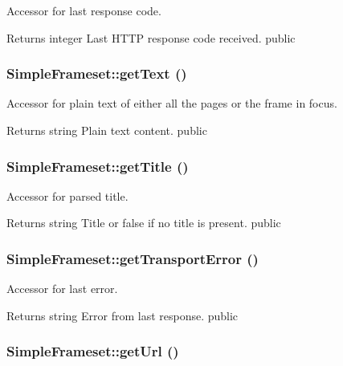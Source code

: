 \label{class_simple_frameset_a49557a01b0b0ce760bb5a4497c2e1055}
Accessor for last response code. \begin{DoxyReturn}{Returns}
integer Last HTTP response code received.  public 
\end{DoxyReturn}
\hypertarget{class_simple_frameset_ad0e21fbf4af0fd8b3fe39f565740f69b}{
\subsubsection[{getText}]{\setlength{\rightskip}{0pt plus 5cm}SimpleFrameset::getText ()}}
\label{class_simple_frameset_ad0e21fbf4af0fd8b3fe39f565740f69b}
Accessor for plain text of either all the pages or the frame in focus. \begin{DoxyReturn}{Returns}
string Plain text content.  public 
\end{DoxyReturn}
\hypertarget{class_simple_frameset_ac2de6b564406233317763be69cb2b370}{
\subsubsection[{getTitle}]{\setlength{\rightskip}{0pt plus 5cm}SimpleFrameset::getTitle ()}}
\label{class_simple_frameset_ac2de6b564406233317763be69cb2b370}
Accessor for parsed title. \begin{DoxyReturn}{Returns}
string Title or false if no title is present.  public 
\end{DoxyReturn}
\hypertarget{class_simple_frameset_abd6d897acb9ced2ca405ba67f2483098}{
\subsubsection[{getTransportError}]{\setlength{\rightskip}{0pt plus 5cm}SimpleFrameset::getTransportError ()}}
\label{class_simple_frameset_abd6d897acb9ced2ca405ba67f2483098}
Accessor for last error. \begin{DoxyReturn}{Returns}
string Error from last response.  public 
\end{DoxyReturn}
\hypertarget{class_simple_frameset_a4126babe4b4451217db33c9f018a5ca3}{
\subsubsection[{getUrl}]{\setlength{\rightskip}{0pt plus 5cm}SimpleFrameset::getUrl ()}}
